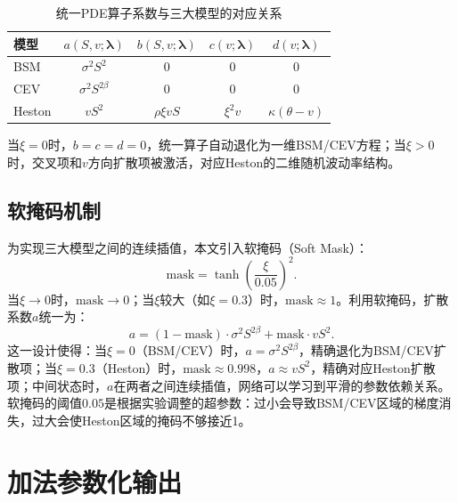 \begin{table}[htbp]
  \centering
  \caption{统一PDE算子系数与三大模型的对应关系}
  \label{tab:unified_coefficients}
  \begin{tabular}{lcccc}
    \hline
    模型 & $a(S,v;\boldsymbol{\lambda})$ & $b(S,v;\boldsymbol{\lambda})$ & $c(v;\boldsymbol{\lambda})$ & $d(v;\boldsymbol{\lambda})$ \\
    \hline
    BSM & $\sigma^2 S^2$ & $0$ & $0$ & $0$ \\
    CEV & $\sigma^2 S^{2\beta}$ & $0$ & $0$ & $0$ \\
    Heston & $vS^2$ & $\rho\xi vS$ & $\xi^2 v$ & $\kappa(\theta-v)$ \\
    \hline
  \end{tabular}
\end{table}

当$\xi=0$时，$b=c=d=0$，统一算子自动退化为一维BSM/CEV方程；当$\xi>0$时，交叉项和$v$方向扩散项被激活，对应Heston的二维随机波动率结构。

\subsection{软掩码机制}

为实现三大模型之间的连续插值，本文引入软掩码（Soft Mask）：
\begin{equation}\label{eq:soft_mask}
  \text{mask} = \tanh\!\left(\frac{\xi}{0.05}\right)^2.
\end{equation}
当$\xi\to 0$时，$\text{mask}\to 0$；当$\xi$较大（如$\xi=0.3$）时，$\text{mask}\approx 1$。利用软掩码，扩散系数$a$统一为：
\begin{equation}\label{eq:soft_a}
  a = (1-\text{mask})\cdot\sigma^2 S^{2\beta} + \text{mask}\cdot v S^2.
\end{equation}
这一设计使得：当$\xi=0$（BSM/CEV）时，$a=\sigma^2 S^{2\beta}$，精确退化为BSM/CEV扩散项；当$\xi=0.3$（Heston）时，$\text{mask}\approx 0.998$，$a\approx vS^2$，精确对应Heston扩散项；中间状态时，$a$在两者之间连续插值，网络可以学习到平滑的参数依赖关系。软掩码的阈值$0.05$是根据实验调整的超参数：过小会导致BSM/CEV区域的梯度消失，过大会使Heston区域的掩码不够接近1。

\section{加法参数化输出}\label{sec:additive_param}

